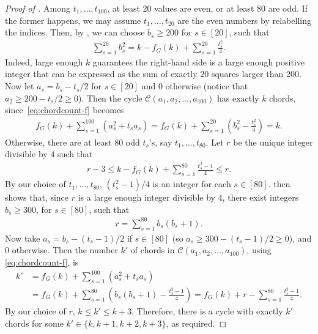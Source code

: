 \documentclass[11pt,english]{article}
\theoremstyle{plain}
\theoremstyle{definition}
\theoremstyle{remark}
\newcommand{\C}{\mathcal{C}}
\begin{document}
\begin{proof} [Proof of ]
	Among $t_1, \ldots, t_{100}$, at least $20$ values are even, or at least $80$ are odd. If the former happens, we may assume $t_1,\ldots,t_{20}$ are the even numbers by relabelling the indices. Then, by , we can choose $b_s\geq 200$ for $s \in [20]$, such that
	\begin{align*}
	    \sum_{s = 1}^{20} b_s^2 = k - f_G(k) + \sum_{s=1}^{20}\frac{t_s^2}{4}.
	\end{align*}
	Indeed, large enough $k$ guarantees the right-hand side is a large enough positive integer that can be expressed as the sum of exactly $20$ squares larger than $200$.
	Now let $a_s = b_s-t_s/2$ for $s \in [20]$ and 0 otherwise (notice that $a_2 \ge 200 - t_s/2 \ge 0$). Then the cycle $\C(a_1,a_2,\ldots,a_{100})$ has exactly $k$ chords, since~\eqref{eq:chordcount-f} becomes
	\begin{align*}
	    f_G(k)+\sum_{s=1}^{100} (a_s^2+t_sa_s)
	    =f_G(k) + \sum_{s = 1}^{20} \left( b_s^2 - \frac{t_s^2}{4}\right) = k.
	\end{align*}
	Otherwise, there are at least $80$ odd $t_s$'s, say $t_1,\ldots,t_{80}$. Let $r$ be the unique integer divisible by $4$ such that 
	\begin{align*}
	    r-3 \le k-f_G(k)+\sum_{s=1}^{80}\frac{t_s^2-1}{4} \le r.
	\end{align*}
	By our choice of $t_1,\dots,t_{80}$, $(t_s^2 - 1)/4$ is an integer for each $s\in[80]$.
	 then shows that, since $r$ is a large enough integer divisible by $4$, there exist integers $b_s \ge 300$, for $s \in [80]$, such that
	\begin{align*}
	    r = \sum_{s=1}^{80} b_s(b_s+1).
	\end{align*}
	Now take $a_s = b_s - (t_s - 1)/2$ if $s \in [80]$ (so $a_s \ge 300 - (t_s-1)/2 \ge 0$), and $0$ otherwise. Then the number $k'$ of chords in $\C(a_1,a_2,\ldots,a_{100})$, using \eqref{eq:chordcount-f}, is 
	\begin{align*}
	    k' 
	    & = f_G(k) + \sum_{s=1}^{100}(a_s^2 + t_s a_s) \\
	    & = f_G(k) + \sum_{s=1}^{80}\left(b_s(b_s+1) - \frac{t_s^2-1}{4}\right)
	    = f_G(k) + r - \sum_{s=1}^{80}\frac{t_s^2-1}{4}.
	\end{align*}
	By our choice of $r$, $k \le k' \le k+3$. Therefore, there is a cycle with exactly $k'$ chords for some $k' \in \{k, k+1, k+2, k+3\}$, as required.
	\end{proof}
	
\end{document}
